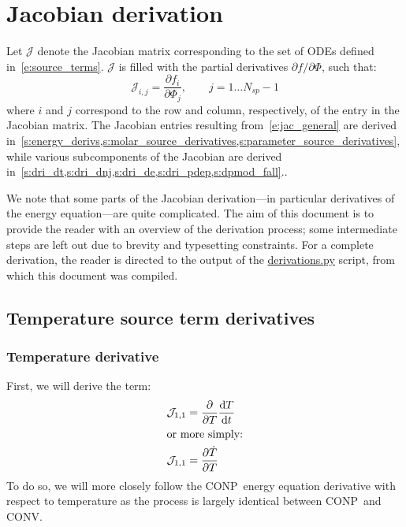 \documentclass[12pt]{article}
\newcommand{\ns}{N_{sp}}
\newcommand{\conp}{CONP}
\newcommand{\conv}{CONV}
\begin{document}
\section{Jacobian derivation}

Let $\mathcal{J}$ denote the Jacobian matrix corresponding to the set of ODEs defined in~\cref{e:source_terms}.
$\mathcal{J}$ is filled with the partial derivatives $\partial f / \partial \Phi$, such that:
\begin{equation}
 \label{e:jac_general}
 \mathcal{J}_{i,j} = \frac{\partial f_i}{\partial \Phi_j},\qquad j=1 \ldots \ns - 1
\end{equation}
where $i$ and $j$ correspond to the row and column, respectively, of the entry in the Jacobian matrix.
The Jacobian entries resulting from~\cref{e:jac_general} are derived in~\cref{s:energy_derivs,s:molar_source_derivatives,s:parameter_source_derivatives}, while various subcomponents of the Jacobian are derived in~\cref{s:dri_dt,s:dri_dnj,s:dri_de,s:dri_pdep,s:dpmod_fall}..

We note that some parts of the Jacobian derivation---in particular derivatives of the energy equation---are quite complicated.
The aim of this document is to provide the reader with an overview of the derivation process; some intermediate steps are left out due to brevity and typesetting constraints.
For a complete derivation, the reader is directed to the output of the \href{https://github.com/arghdos/SPyJac-paper/blob/master/derivations/scripts/derivations.py}{derivations.py} script, from which this document was compiled.

\subsection{Temperature source term derivatives}
\label{s:energy_derivs}
\subsubsection{Temperature derivative}
\label{s:denergy_dt}
First, we will derive the term:
\begin{align}
 \mathcal{J}_{1,1} &= \frac{\partial}{\partial T} \frac{\text{d} T}{\text{d} t} \nonumber \\
 \intertext{or more simply:}
 \mathcal{J}_{1,1} &= \frac{\partial\dot{T}}{\partial{T}}
\end{align}
To do so, we will more closely follow the \conp~energy equation derivative with respect to temperature as the process is largely identical between \conp~and \conv.
\end{document}
